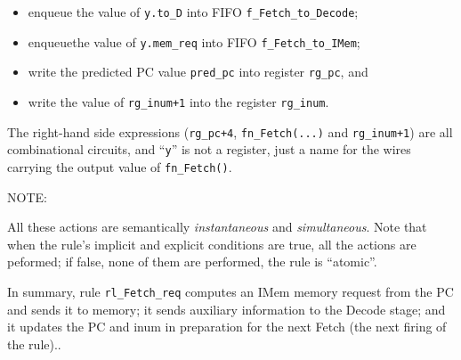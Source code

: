 \begin{itemize}

 \item enqueue the value of \verb|y.to_D| into FIFO \verb|f_Fetch_to_Decode|;

 \item enqueuethe value of \verb|y.mem_req| into FIFO \verb|f_Fetch_to_IMem|;

 \item write the predicted PC value \verb|pred_pc| into register \verb|rg_pc|, and

 \item write the value of \verb|rg_inum+1| into the register \verb|rg_inum|.

\end{itemize}

The right-hand side expressions (\verb|rg_pc+4|, \verb|fn_Fetch(...)| and
\verb|rg_inum+1|) are all combinational circuits, and ``\verb|y|'' is
not a register, just a name for the wires carrying the output value of
\verb|fn_Fetch()|.


\vspace{1ex}

NOTE: 

\vspace{1ex}


All these actions are semantically \emph{instantaneous} and
\emph{simultaneous}.  Note that when the rule's implicit and explicit
conditions are true, all the actions are peformed; if false, none of
them are performed, {\ie} the rule is ``atomic''.

In summary, rule \verb|rl_Fetch_req| computes an IMem memory request
from the PC and sends it to memory; it sends auxiliary information to
the Decode stage; and it updates the PC and inum in preparation for
the next Fetch (the next firing of the rule)..

